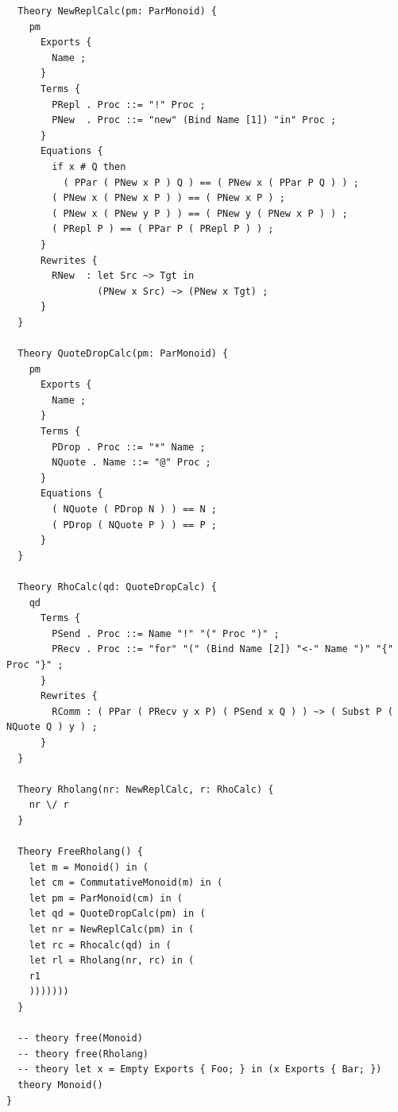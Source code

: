 \documentclass{article}
\begin{document}
\begin{verbatim}
  Theory NewReplCalc(pm: ParMonoid) {
    pm
      Exports {
        Name ;
      }
      Terms {
        PRepl . Proc ::= "!" Proc ;
        PNew  . Proc ::= "new" (Bind Name [1]) "in" Proc ;
      }
      Equations {
        if x # Q then
          ( PPar ( PNew x P ) Q ) == ( PNew x ( PPar P Q ) ) ;
        ( PNew x ( PNew x P ) ) == ( PNew x P ) ;
        ( PNew x ( PNew y P ) ) == ( PNew y ( PNew x P ) ) ;
        ( PRepl P ) == ( PPar P ( PRepl P ) ) ;
      }
      Rewrites {
        RNew  : let Src ~> Tgt in
                (PNew x Src) ~> (PNew x Tgt) ;
      }
  }
 
  Theory QuoteDropCalc(pm: ParMonoid) {
    pm
      Exports {
        Name ;
      }
      Terms {
        PDrop . Proc ::= "*" Name ;
        NQuote . Name ::= "@" Proc ;
      }
      Equations {
        ( NQuote ( PDrop N ) ) == N ;
        ( PDrop ( NQuote P ) ) == P ;
      }
  }

  Theory RhoCalc(qd: QuoteDropCalc) {
    qd
      Terms {
        PSend . Proc ::= Name "!" "(" Proc ")" ;
        PRecv . Proc ::= "for" "(" (Bind Name [2]) "<-" Name ")" "{" Proc "}" ;
      }
      Rewrites {
        RComm : ( PPar ( PRecv y x P) ( PSend x Q ) ) ~> ( Subst P ( NQuote Q ) y ) ;
      }
  }

  Theory Rholang(nr: NewReplCalc, r: RhoCalc) {
    nr \/ r
  }
  
  Theory FreeRholang() {
    let m = Monoid() in (
    let cm = CommutativeMonoid(m) in (
    let pm = ParMonoid(cm) in (
    let qd = QuoteDropCalc(pm) in (
    let nr = NewReplCalc(pm) in (
    let rc = Rhocalc(qd) in (
    let rl = Rholang(nr, rc) in (
    r1
    )))))))
  }

  -- theory free(Monoid)
  -- theory free(Rholang)
  -- theory let x = Empty Exports { Foo; } in (x Exports { Bar; })
  theory Monoid()
}
\end{verbatim}
\end{document}
